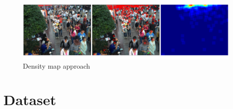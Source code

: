 \documentclass[10pt,twocolumn,letterpaper]{article}
\begin{document}
\begin{figure}[h!]
  \includegraphics[width=\linewidth]{pics/densitymapapproach.png}
  \caption{Density map approach}
  \label{fig:densitymap}
\end{figure}



\section{Dataset}



\printbibliography

%
%
\end{document}
